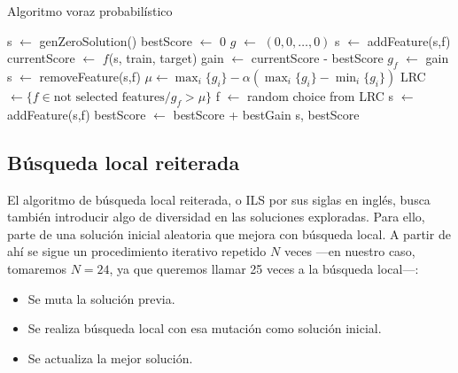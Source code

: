 \documentclass[a4paper, 11pt, titlepage]{article}
\begin{document}
    \begin{algorithm}
        \caption{Algoritmo voraz probabilístico}\label{algRandomSFS}
        \begin{algorithmic}[1]
            \State s $\gets$ genZeroSolution()
            \State bestScore $\gets$ 0
                \State $g$ $\gets$ $(0,0,\dots,0)$ 
                    \State s $\gets$ addFeature(s,f)
                    \State currentScore $\gets$ $f$(s, train, target)
                    \State gain $\gets$ currentScore - bestScore
                    \State $g_f$ $\gets$ gain
                    \State s $\gets$ removeFeature(s,f)
                \EndFor
                \State $\mu \gets \max_{i}\{g_i\} - \alpha (\max_{i}\{g_i\} - \min_{i}\{g_i\})$
                \State LRC $\gets \{f \in \textrm{not selected features} / g_f > \mu\}$
                \State f $\gets$ random choice from LRC
                    \State s $\gets$ addFeature(s,f)
                    \State bestScore $\gets$ bestScore + bestGain
                \EndIf
            \EndWhile
            \State \Return s, bestScore
            \EndFunction
        \end{algorithmic}
    \end{algorithm}

    \subsection{Búsqueda local reiterada}

    El algoritmo de búsqueda local reiterada, o ILS por sus siglas en inglés, busca también introducir algo de diversidad en las soluciones exploradas. Para ello, parte de una solución inicial aleatoria que mejora con búsqueda local. A partir de ahí se sigue un procedimiento iterativo repetido $N$ veces ---en nuestro caso, tomaremos $N = 24$, ya que queremos llamar 25 veces a la búsqueda local---:
    \begin{itemize}
        \item Se muta la solución previa.
        \item Se realiza búsqueda local con esa mutación como solución inicial.
        \item Se actualiza la mejor solución.
    \end{itemize}
\end{document}
